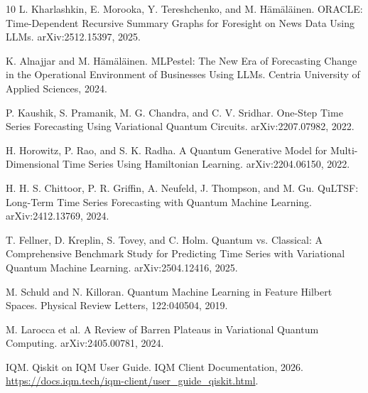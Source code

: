 \documentclass[10pt,twocolumn]{article}
\begin{document}
\begin{thebibliography}{10}
L. Kharlashkin, E. Morooka, Y. Tereshchenko, and M. Hämäläinen.
\newblock ORACLE: Time-Dependent Recursive Summary Graphs for Foresight on News Data Using LLMs.
\newblock arXiv:2512.15397, 2025.

K. Alnajjar and M. Hämäläinen.
\newblock MLPestel: The New Era of Forecasting Change in the Operational Environment of Businesses Using LLMs.
\newblock Centria University of Applied Sciences, 2024.

P. Kaushik, S. Pramanik, M. G. Chandra, and C. V. Sridhar.
\newblock One-Step Time Series Forecasting Using Variational Quantum Circuits.
\newblock arXiv:2207.07982, 2022.

H. Horowitz, P. Rao, and S. K. Radha.
\newblock A Quantum Generative Model for Multi-Dimensional Time Series Using Hamiltonian Learning.
\newblock arXiv:2204.06150, 2022.

H. H. S. Chittoor, P. R. Griffin, A. Neufeld, J. Thompson, and M. Gu.
\newblock QuLTSF: Long-Term Time Series Forecasting with Quantum Machine Learning.
\newblock arXiv:2412.13769, 2024.

T. Fellner, D. Kreplin, S. Tovey, and C. Holm.
\newblock Quantum vs. Classical: A Comprehensive Benchmark Study for Predicting Time Series with Variational Quantum Machine Learning.
\newblock arXiv:2504.12416, 2025.

M. Schuld and N. Killoran.
\newblock Quantum Machine Learning in Feature Hilbert Spaces.
\newblock Physical Review Letters, 122:040504, 2019.

M. Larocca et al.
\newblock A Review of Barren Plateaus in Variational Quantum Computing.
\newblock arXiv:2405.00781, 2024.

IQM.
\newblock Qiskit on IQM User Guide.
\newblock IQM Client Documentation, 2026.
\newblock \url{https://docs.iqm.tech/iqm-client/user_guide_qiskit.html}.
\end{thebibliography}
\end{document}
